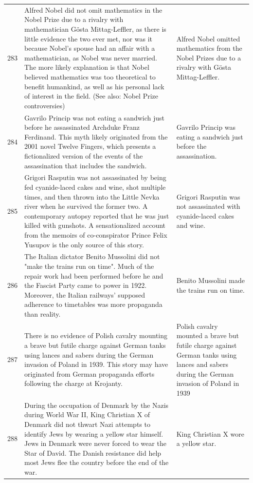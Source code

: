 \begin{tabular}{c|p{}|p{}}
283 & Alfred Nobel did not omit mathematics in the Nobel Prize due to a rivalry with mathematician Gösta Mittag-Leffler, as there is little evidence the two ever met, nor was it because Nobel's spouse had an affair with a mathematician, as Nobel was never married. The more likely explanation is that Nobel believed mathematics was too theoretical to benefit humankind, as well as his personal lack of interest in the field. (See also: Nobel Prize controversies) & Alfred Nobel omitted mathematics from the Nobel Prizes due to a rivalry with Gösta Mittag-Leffler. \\
284 & Gavrilo Princip was not eating a sandwich just before he assassinated Archduke Franz Ferdinand. This myth likely originated from the 2001 novel Twelve Fingers, which presents a fictionalized version of the events of the assassination that includes the sandwich. & Gavrilo Princip was eating a sandwich just before the assassination. \\
285 & Grigori Rasputin was not assassinated by being fed cyanide-laced cakes and wine, shot multiple times, and then thrown into the Little Nevka river when he survived the former two. A contemporary autopsy reported that he was just killed with gunshots. A sensationalized account from the memoirs of co-conspirator Prince Felix Yusupov is the only source of this story. & Grigori Rasputin was not assassinated with cyanide-laced cakes and wine. \\
286 & The Italian dictator Benito Mussolini did not "make the trains run on time". Much of the repair work had been performed before he and the Fascist Party came to power in 1922. Moreover, the Italian railways' supposed adherence to timetables was more propaganda than reality. & Benito Mussolini made the trains run on time. \\
287 & There is no evidence of Polish cavalry mounting a brave but futile charge against German tanks using lances and sabers during the German invasion of Poland in 1939. This story may have originated from German propaganda efforts following the charge at Krojanty. & Polish cavalry mounted a brave but futile charge against German tanks using lances and sabers during the German invasion of Poland in 1939 \\
288 & During the occupation of Denmark by the Nazis during World War II, King Christian X of Denmark did not thwart Nazi attempts to identify Jews by wearing a yellow star himself. Jews in Denmark were never forced to wear the Star of David. The Danish resistance did help most Jews flee the country before the end of the war. & King Christian X wore a yellow star. \\

\end{tabular}
